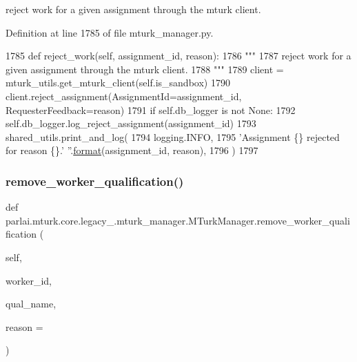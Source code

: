 \begin{DoxyVerb}reject work for a given assignment through the mturk client.
\end{DoxyVerb}
 

Definition at line 1785 of file mturk\+\_\+manager.\+py.


\begin{DoxyCode}
1785     \textcolor{keyword}{def }reject\_work(self, assignment\_id, reason):
1786         \textcolor{stringliteral}{"""}
1787 \textcolor{stringliteral}{        reject work for a given assignment through the mturk client.}
1788 \textcolor{stringliteral}{        """}
1789         client = mturk\_utils.get\_mturk\_client(self.is\_sandbox)
1790         client.reject\_assignment(AssignmentId=assignment\_id, RequesterFeedback=reason)
1791         \textcolor{keywordflow}{if} self.db\_logger \textcolor{keywordflow}{is} \textcolor{keywordflow}{not} \textcolor{keywordtype}{None}:
1792             self.db\_logger.log\_reject\_assignment(assignment\_id)
1793         shared\_utils.print\_and\_log(
1794             logging.INFO,
1795             \textcolor{stringliteral}{'Assignment \{\} rejected for reason \{\}.'} \textcolor{stringliteral}{''}.\hyperlink{namespaceparlai_1_1chat__service_1_1services_1_1messenger_1_1shared__utils_a32e2e2022b824fbaf80c747160b52a76}{format}(assignment\_id, reason),
1796         )
1797 
\end{DoxyCode}
\mbox{\label{classparlai_1_1mturk_1_1core_1_1legacy__2018_1_1mturk__manager_1_1MTurkManager_abd558e7e15be458ebb7d0f6827b7da9e}} 
\subsubsection{\texorpdfstring{remove\+\_\+worker\+\_\+qualification()}{remove\_worker\_qualification()}}
{\footnotesize\ttfamily def parlai.\+mturk.\+core.\+legacy\+\_.\+mturk\+\_\+manager.\+M\+Turk\+Manager.\+remove\+\_\+worker\+\_\+qualification (\begin{DoxyParamCaption}\item[{}]{self,  }\item[{}]{worker\+\_\+id,  }\item[{}]{qual\+\_\+name,  }\item[{}]{reason = {\ttfamily \textquotesingle{}\textquotesingle{}} }\end{DoxyParamCaption})}

